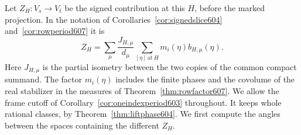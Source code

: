 \documentclass[a4paper,11pt]{article}
\theoremstyle{definition}
\theoremstyle{remark}
\numberwithin{equation}{section}
\begin{document}
Let \(Z_H:V_s\to V_t\) be the signed contribution at this \(H\),
before the marked projection. In the notation of
Corollaries~\ref{cor:signedslice604} and~\ref{cor:rowperiod607} it is
\begin{equation}
  Z_H=\sum_\mu \frac{J_{H,\mu}}{d_\mu}
                 \sum_{[\eta]\ \mathrm{at}\ H}m_i(\eta)b_{H,\mu}(\eta).
  \label{eq:hyperplaneslice610}
\end{equation}
Here \(J_{H,\mu}\) is the partial isometry between the two
copies of the common compact summand. The factor \(m_i(\eta)\)
includes the finite phases and the covolume of the real stabilizer
in the measures of Theorem~\ref{thm:rowfactor607}. We allow the
frame cutoff of Corollary~\ref{cor:oneindexperiod603} throughout.
It keeps whole rational classes, by Theorem~\ref{thm:liftphase604}.
We first compute the angles between the spaces containing the
different \(Z_H\).
\end{document}
